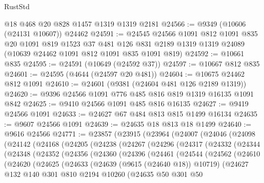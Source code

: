 \begin{lexlean}{RustStd}
\begin{coremodule}
    @18
    @468
    @20
    @828
    @1457
    @1319
    @1319
    @2181
@24566 := @9349 (@10606 (@24131 @10607)) @24462
@24591 := @24545
    @24566
    @1091
    @812
    @1091
    @835
    @20
    @1091
    @819
    @1523
    @37
    @481
    @126
    @831
    @2189
    @1319
    @1319
    @24089
    (@10639 @24462 @1091 @812 @1091 @835 @1091 @819)
@24592 := @10661 @835
@24595 := @24591 (@10649 (@24592 @37))
@24597 := @10667 @812 @835
@24601 := @24595 (@4644 (@24597 @20 @481))
@24604 := @10675 @24462 @812 @1091
@24610 := @24601 (@9381 (@24604 @481 @126 @2189 @1319))
@24620 := @9396 @24566 @1091 @776 @485 @816 @819 @1319 @16135 @1091 @842
@24625 := @9410 @24566 @1091 @485 @816 @16135
@24627 := @9419 @24566 @1091
@24633 := @24627 @67 @484 @813 @815 @1499 @16134
@24635 := @9607 @24566 @1091
@24639 := @24635 @18 @813 @18 @1499
@24640 := @9616 @24566
@24771 := @23857
    (@23915
      (@23964
        (@24007
          (@24046
            (@24098
              (@24142
                (@24168
                  (@24205
                    (@24238
                      (@24267
                        (@24296
                          (@24317
                            (@24332
                              (@24344
                                (@24348
                                  (@24352
                                    (@24356
                                      (@24360
                                        (@24396
                                          (@24461
                                            (@24544
                                              (@24562
                                                (@24610
                                                  (@24620
                                                    (@24625
                                                      (@24633
                                                        (@24639 (@9615 (@24640 @18)) @10719)
                                                        (@24627
                                                          @132
                                                          @140
                                                          @301
                                                          @810
                                                          @2194
                                                          @10260
                                                          (@24635
                                                            @50
                                                            @301
                                                            @50

\end{coremodule}
\end{lexlean}
